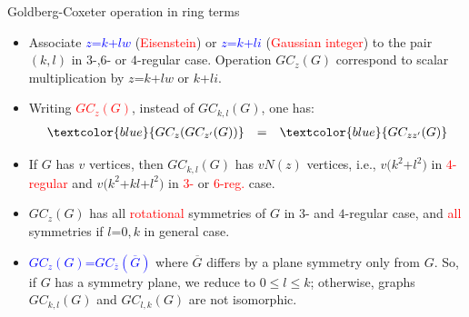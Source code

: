 \documentclass{beamer}
\begin{document}
\begin{frame}{Goldberg-Coxeter operation in ring terms}
\vspace{-2.5mm}
\begin{itemize}
\item Associate 
\textcolor{blue}{$z$=$k$+$lw$} (\textcolor{red}{Eisenstein}) or
\textcolor{blue}{$z$=$k$+$li$} 
(\textcolor{red}{Gaussian integer}) to the 
pair $(k,l)$ in 
$3$-,$6$- or 
$4$-regular case. Operation $GC_{z}(G)$ correspond to scalar 
multiplication by 
$z$=$k$+$lw$ or $k$+$li$. 

\item Writing \textcolor{red}{$GC_{z}(G)$}, instead of 
$GC_{k,l}(G)$, one has:
\begin{equation*}
\begin{array}{rcl}
\textcolor{blue}{GC_{z}(GC_{z'}(G))}  &=&\textcolor{blue}{GC_{zz'}(G)}
\end{array}
\end{equation*}

\item If $G$ has $v$ vertices, then $GC_{k,l}(G)$ has
$vN(z)$ vertices, i.e.,
$v(k^2$+$l^2)$ in \textcolor{red}{$4$-regular}
 and $v(k^2$+$kl$+$l^2)$ in  
\textcolor{red}{$3$-} or \textcolor{red}{$6$-reg.} case.\pause

\item $GC_{z}(G)$ has all \textcolor{red}{rotational} symmetries of 
$G$ in $3$- and $4$-regular case, and \textcolor{red}{all} 
symmetries 
if $l$=$0,k$ in general case.
\item 
\textcolor{blue}{$GC_{z}(G)$=$GC_{\overline{z}}(\overline{G})$} where $\overline{G}$ 
differs by a plane symmetry only from $G$. 
So, if $G$ has a symmetry plane, we reduce to $0$$\le$$ l$$\le$$ k$;
otherwise, graphs  $GC_{k,l}(G)$ and $GC_{l,k}(G)$ are not 
isomorphic. 
\end{itemize}
\end{frame}
\end{document}
